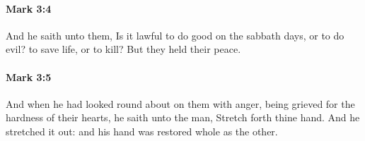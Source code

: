 		\paragraph{Mark 3:4} %
			\label{MARK-3-4}

			And he saith unto them, Is it lawful to do good on the sabbath days, or to do evil? to save life, or to kill? But they held their peace.

			\begin{framed}
			\scriptsize
				\begin{compactdesc}
					\item[SBLG] 
				\end{compactdesc}
			\end{framed}

		\paragraph{Mark 3:5} %
			\label{MARK-3-5}

			And when he had looked round about on them with anger, being grieved for the hardness of their hearts, he saith unto the man, Stretch forth thine hand. And he stretched it out: and his hand was restored whole as the other.

